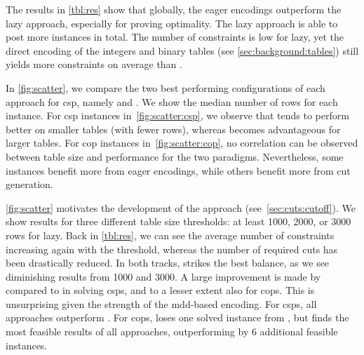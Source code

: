 \documentclass[a4paper,UKenglish,cleveref,autoref,thm-restate]{lipics-v2021}
\begin{document}
The results in \cref{tbl:res} show that globally, the eager encodings outperform the lazy approach, especially for proving optimality.
The lazy approach is able to post more instances in total.
The number of constraints is low for lazy, yet the direct encoding of the integers and binary tables (see \cref{sec:background:tables}) still yields more constraints on average than \baseGleb.

In \cref{fig:scatter}, we compare the two best performing configurations of each approach for \gls{csp}, namely \baseMddDomIncr and \lazyAll.
We show the median number of rows for each instance.
For \gls{csp} instances in~\cref{fig:scatter:csp}, we observe that \baseMddDomIncr tends to perform better on smaller tables (with fewer rows), whereas \lazyAll becomes advantageous for larger tables.
For \gls{cop} instances in~\cref{fig:scatter:cop}, no correlation can be observed between table size and performance for the two paradigms.
Nevertheless, some instances benefit more from eager encodings, while others benefit more from cut generation.

\cref{fig:scatter} motivates the development of the \lazyCutoff approach (see~\cref{sec:cuts:cutoff}).
We show results for three different table size thresholds: at least 1000, 2000, or 3000 rows for lazy.
Back in \cref{tbl:res}, we can see the average number of constraints increasing again with the threshold, whereas the number of required cuts has been drastically reduced.
In both tracks,  strikes the best balance, as we see diminishing results from 1000 and 3000.
A large improvement is made by  compared to \lazyAll in solving \glspl{csp}, and to a lesser extent also for \glspl{cop}.
This is unsurprising given the strength of the \gls{mdd}-based encoding.
For \glspl{csp}, all \lazyCutoff approaches outperform \baseMddDomIncr.
For \glspl{cop},  loses one solved instance from \baseMddDomIncr, but finds the most feasible results of all approaches, outperforming \baseGleb by 6 additional feasible instances.


\newcommand{\scatterCaption}{
Scatter plots of solve time in seconds for all instances of the \XCSPYears \gls{csp} and \gls{cop} tracks.
Compares \lazyAll (x-axis) against \baseMddDomIncr (y-axis), meaning bottom/right solves faster for \lazyAll and top/left solves faster for \baseMddDomIncr.
Instances in the top/right grey area have reached timeout, and instances which timeout for both approaches are omitted.
The colour of an instance indicates the median number of rows in its tables, and its shape indicates its problem class.
}
\end{document}
